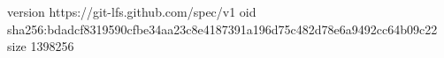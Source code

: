 version https://git-lfs.github.com/spec/v1
oid sha256:bdadcf8319590cfbe34aa23c8e4187391a196d75c482d78e6a9492cc64b09c22
size 1398256
